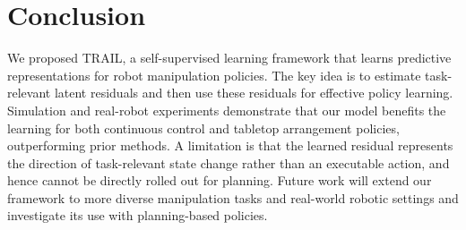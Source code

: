 \section{Conclusion}
We proposed TRAIL, a self-supervised learning framework that learns predictive representations for robot manipulation policies. The key idea is to estimate task-relevant latent residuals and then use these residuals for effective policy learning. Simulation and real-robot experiments demonstrate that our model benefits the learning for both continuous control and tabletop arrangement policies, outperforming prior methods. A limitation is that the learned residual represents the direction of task-relevant state change rather than an executable action, and hence cannot be directly rolled out for planning. Future work will extend our framework to more diverse manipulation tasks and real-world robotic settings and investigate its use with planning-based policies.
